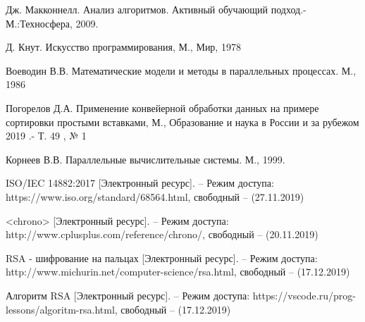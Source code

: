 \documentclass[a4paper,12pt]{article}
\begin{document}
\begin{thebibliography}{10}

Дж. Макконнелл. Анализ алгоритмов. Активный 
обучающий 
подход.-М.:Техносфера, 2009.

Д. Кнут. Искусство программирования, М., Мир, 1978

Воеводин В.В. Математические модели и методы в параллельных процессах. М., 1986

Погорелов Д.А. Применение конвейерной обработки данных на примере сортировки простыми вставками, М., Образование и наука в России и за рубежом
2019 .- Т. 49 , № 1

Корнеев В.В. Параллельные вычислительные системы. М., 1999.

ISO/IEC 14882:2017 [Электронный ресурс]. – Режим доступа: https://www.iso.org/standard/68564.html, свободный – (27.11.2019)

<chrono> [Электронный ресурс]. – Режим доступа: http://www.cplusplus.com/reference/chrono/, свободный – (20.11.2019)

RSA - шифрование на пальцах [Электронный ресурс]. – Режим доступа: http://www.michurin.net/computer-science/rsa.html, свободный – (17.12.2019)

Алгоритм RSA [Электронный ресурс]. – Режим доступа: https://vscode.ru/prog-lessons/algoritm-rsa.html, свободный – (17.12.2019)

\end{thebibliography}
\end{document}
